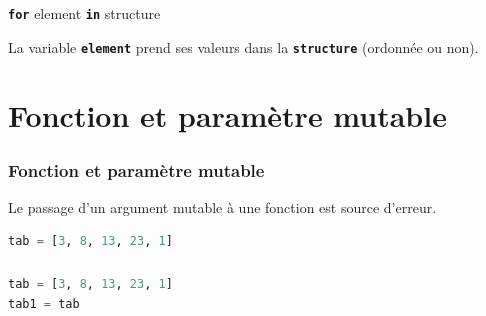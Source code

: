 \documentclass[svgnames,11pt]{beamer}
\begin{document}
\begin{frame}[fragile]
    \frametitle{}

    \begin{center}
        {\LARGE \texttt{\textbf{for}} element \texttt{\textbf{in}} structure}
    \end{center}
La variable \textbf{\texttt{element}} prend ses valeurs dans la \textbf{\texttt{structure}} (ordonnée ou non).
    
\end{frame}
\section{Fonction et paramètre mutable}
\begin{frame}
    \frametitle{Fonction et paramètre mutable}

    \begin{aretenir}[Observation]
Le passage d'un argument mutable à une fonction est source d'erreur.
    \end{aretenir}

\end{frame}
\begin{frame}[fragile]
    \begin{center}
    \begin{lstlisting}[language=Python, basicstyle=\ttfamily\small , xleftmargin=1em, xrightmargin=1em]
tab = [3, 8, 13, 23, 1]
\end{lstlisting}
\end{center}

\end{frame}
\begin{frame}[fragile]
    \frametitle{}
\begin{center}
\begin{lstlisting}[language=Python, basicstyle=\ttfamily\small , xleftmargin=1em, xrightmargin=1em]
tab = [3, 8, 13, 23, 1]
tab1 = tab
\end{lstlisting}
\end{center}

\end{frame}
\end{document}
